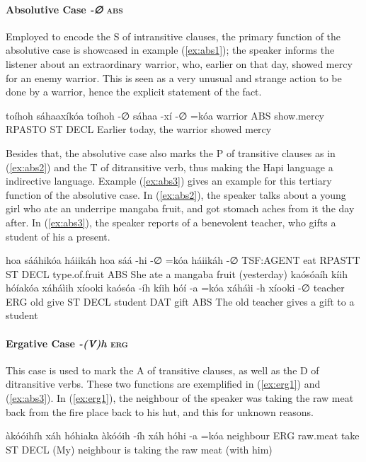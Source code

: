 \documentclass[a4paper, 12pt, oneside]{memoir}
\newcommand{\emh}[1]{\textit{#1}}
\begin{document}
\paragraph{Absolutive Case \emh{-∅} \textsc{abs}}
Employed to encode the S of intransitive clauses, the primary function of the absolutive case is showcased in example (\ref{ex:abs1}); the speaker informs the listener about an extraordinary warrior, who, earlier on that day, showed mercy for an enemy warrior. This is seen as a very unusual and strange action to be done by a warrior, hence the explicit statement of the fact. 
\begin{examples}
\ex \label{ex:abs1}
\words toíhoh sáhaaxíkóa
\bits toíhoh -∅ sáhaa -xí -∅ =kóa 
\gloss warrior ABS show.mercy RPASTO ST  DECL 
\tr Earlier today, the warrior showed mercy
\end{examples}
Besides that, the absolutive case also marks the P of transitive clauses as in (\ref{ex:abs2}) and the T of ditransitive verb, thus making the Hapi language a indirective language. Example (\ref{ex:abs3}) gives an example for this tertiary function of the absolutive case.
In (\ref{ex:abs2}), the speaker talks about a young girl who ate an underripe mangaba fruit, and got stomach aches from it the day after. In (\ref{ex:abs3}), the speaker reports of a benevolent teacher, who gifts a student of his a present.
\begin{examples}
\ex \label{ex:abs2}
\words hoa sááhikóa háiikáh
\bits hoa sáá -hi -∅ =kóa háiikáh -∅ 
\gloss TSF:AGENT eat RPASTT ST DECL type.of.fruit ABS
\tr She ate a mangaba fruit (yesterday)
\ex \label{ex:abs3}
\words kaósóaíh kíih hóíakóa xáháìih xíooki
\bits kaósóa -íh kíih hóí -a =kóa xáháìi -h xíooki -∅
\gloss teacher ERG old give ST DECL student DAT gift ABS
\tr The old teacher gives a gift to a student
\end{examples}
\paragraph{Ergative Case \emh{-(V́)h} \textsc{erg}}
This case is used to mark the A of transitive clauses, as well as the D of ditransitive verbs. These two functions are exemplified in (\ref{ex:erg1}) and (\ref{ex:abs3}).
In (\ref{ex:erg1}), the neighbour of the speaker was taking the raw meat back from the fire place back to his hut, and this for unknown reasons.
\begin{examples}
\ex \label{ex:erg1}
\words àkóóihíh xáh hóhiaka
\bits àkóóih -íh xáh hóhi -a =kóa 
\gloss  neighbour ERG raw.meat take ST DECL 
\tr (My) neighbour is taking the raw meat (with him)
\end{examples}
\end{document}
